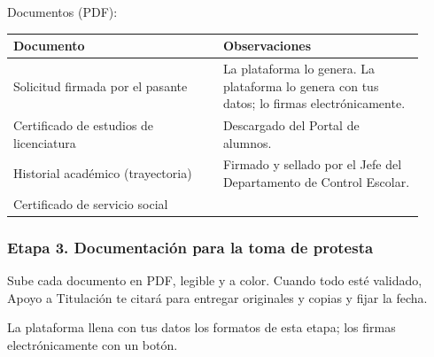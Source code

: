 Documentos (PDF):
{\small\begin{longtable}{>{\raggedright\arraybackslash}p{0.47\linewidth}>{\raggedright\arraybackslash}p{0.45\linewidth}}
\toprule
\textbf{Documento} & \textbf{Observaciones}\\
\midrule
\endhead
Solicitud firmada por el pasante & La plataforma lo genera. La plataforma lo genera con tus datos; lo firmas electrónicamente.\\
Certificado de estudios de licenciatura & Descargado del Portal de alumnos.\\
Historial académico (trayectoria) & Firmado y sellado por el Jefe del Departamento de Control Escolar.\\
Certificado de servicio social & \\
\bottomrule
\end{longtable}}
\subsubsection*{Etapa 3. Documentación para la toma de protesta}
Sube cada documento en PDF, legible y a color. Cuando todo esté validado, Apoyo a Titulación te citará para entregar originales y copias y fijar la fecha.

La plataforma llena con tus datos los formatos de esta etapa; los firmas electrónicamente con un botón.


